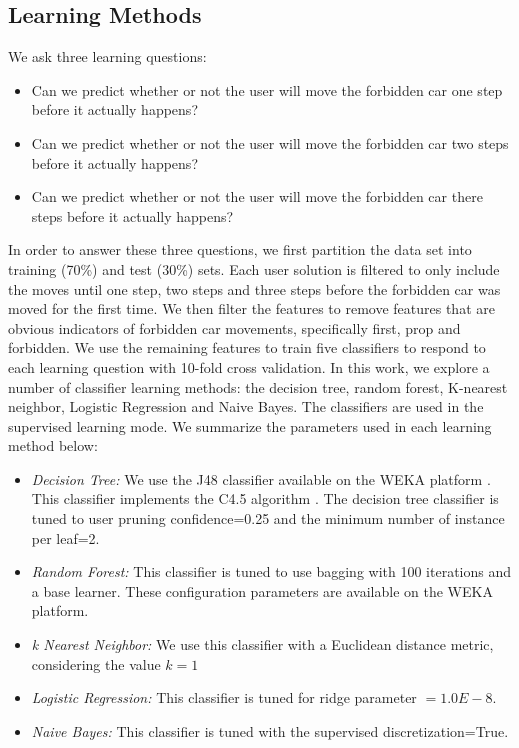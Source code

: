 \documentclass[doctor]{thesis} %
\theoremstyle{plain}
\begin{document}
\subsection*{Learning Methods}
We ask three learning questions:
\begin{itemize}
\item Can we predict whether or not the user will move the forbidden car one step before it actually happens?
\item Can we predict whether or not the user will move the forbidden car two steps before it actually happens?
\item Can we predict whether or not the user will move the forbidden car there steps before it actually happens?
\end{itemize}

In order to answer these three questions, we first partition the data set into training (70\%) and test (30\%) sets. Each user solution is filtered to only include the moves until one step, two steps and three steps before the forbidden car was moved for the first time. We then filter the features to remove features that are obvious indicators of forbidden car movements, specifically first, prop and forbidden. We use the remaining features to train five classifiers to respond to each learning question with 10-fold cross validation. In this work, we explore a number of classifier learning methods: the decision tree, random forest, K-nearest neighbor, Logistic Regression and Naive Bayes. The classifiers are used in the supervised learning mode. We summarize the parameters used in each learning method below:
\begin{itemize}
\item \textit{Decision Tree:} We use the J48 classifier available on the WEKA platform \cite{hall09}. This classifier implements the C4.5 algorithm \cite{quinlan1993c45}. The decision tree classifier is tuned to user pruning confidence=0.25 and the minimum number of instance per leaf=2.
\item \textit{Random Forest:} This classifier is tuned to use bagging with 100 iterations and a base learner. These configuration parameters are available on the WEKA platform. 
\item \textit{k Nearest Neighbor:} We use this classifier with a Euclidean distance metric, considering the value $k=1$
\item \textit{Logistic Regression:} This classifier is tuned for ridge parameter $= 1.0E-8$.
\item \textit{Naive Bayes:} This classifier is tuned with the supervised discretization=True.
\end{itemize}
\end{document}
